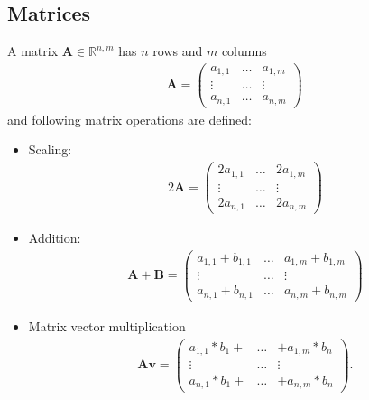 \documentclass[11pt,fleqn]{book} %
\begin{document}
\subsection{Matrices}
A matrix $\mathbf{A}\in \mathbb{R}^{n,m}$ has $n$ rows and $m$ columns
\begin{align}
\mathbf{A} = \begin{pmatrix}
a_{1,1} & \ldots & a_{1,m} \\
\vdots & \ldots & \vdots \\
a_{n,1} & \ldots & a_{n,m} 
\end{pmatrix}
\end{align} 
and following matrix operations are defined:
\begin{itemize}
\item Scaling:
\begin{align}
 2 \mathbf{A} = \begin{pmatrix}
2a_{1,1} & \ldots & 2a_{1,m} \\
\vdots & \ldots & \vdots \\
2a_{n,1} & \ldots & 2a_{n,m} 
\end{pmatrix} 
\end{align}
\item Addition:
\begin{align}
\mathbf{A} + \mathbf{B}  = \begin{pmatrix}
a_{1,1} + b_{1,1}  & \ldots & a_{1,m} + b_{1,m} \\
\vdots & \ldots & \vdots \\
a_{n,1} + b_{n,1} & \ldots & a_{n,m} + b_{n,m} 
\end{pmatrix}
\end{align}
\item Matrix vector multiplication
\begin{align}
\mathbf{A}  \mathbf{v}  = \begin{pmatrix}
a_{1,1} * b_{1} + & \ldots & + a_{1,m} * b_{n} \\
\vdots & \ldots & \vdots \\
a_{n,1} * b_{1} + & \ldots & + a_{n,m} * b_{n} 
\end{pmatrix}\text{.}
\end{align}
\end{itemize}
\end{document}
